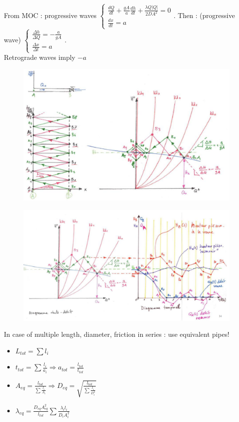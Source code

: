 \documentclass[../main.tex]{subfiles}
\begin{document}
From MOC : progressive waves $\begin{cases}
    \frac{dQ}{dt} + \frac{gA}{a} \frac{dh}{dt} + \frac{\lambda Q \lvert Q \rvert}{2DA^2}=0\\ \frac{dx}{dt} = a
\end{cases}$. Then : (progressive wave) $\begin{cases}
    \frac{\Delta h}{\Delta Q} = -\frac{a}{gA}\\ \frac{\Delta x}{\Delta t} = a
\end{cases}$.\\
\warning Retrograde waves imply $-a$\\

\begin{figure}[hbt!]
    \centering
    \includegraphics[width=0.7\linewidth]{IMAGES/Hydraulic/Screenshot from 2025-03-21 11-50-24.png}
\end{figure}

\begin{figure}[hbt!]
    \centering
    \includegraphics[width=0.7\linewidth]{IMAGES/Hydraulic/Screenshot from 2025-03-21 11-51-32.png}
\end{figure}

In case of multiple length, diameter, friction in series : use equivalent pipes! \begin{itemize}
    \item $L_{tot} = \sum l_i$
    \item $t_{tot} = \sum \frac{l_i}{a_i} \Rightarrow a_{tot} = \frac{l_{tot}}{t_{tot}}$
    \item $A_{eq} = \frac{l_{tot}}{\sum \frac{l_i}{A_i}} \Rightarrow D_{eq} = \sqrt{\frac{l_{tot}}{\sum \frac{l_i}{D_i^2}}}$
    \item $\lambda_{eq} = \frac{D_{eq}A_{eq}^2}{l_{tot}} \sum \frac{\lambda_i l_i}{D_i A_i^2}$
\end{itemize}
\end{document}
